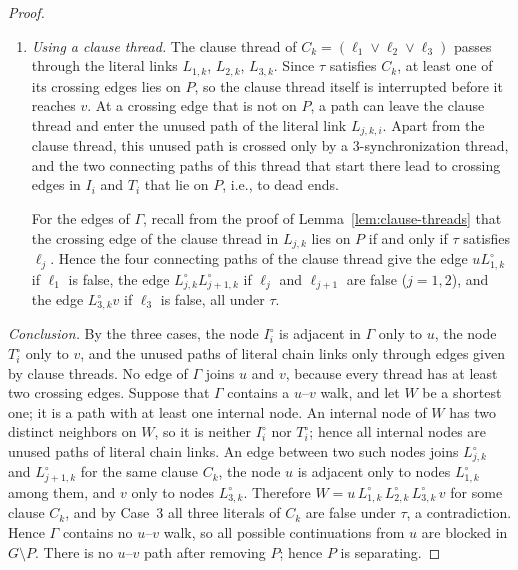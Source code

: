 \begin{proof}
\begin{enumerate}
  \item \emph{Using a clause thread.}
  The clause thread of $C_k = (\ell_1 \vee \ell_2 \vee \ell_3)$ passes through the literal links $L_{1,k}$, $L_{2,k}$, $L_{3,k}$.
  Since $\tau$ satisfies $C_k$, at least one of its crossing edges lies on $P$, so the clause thread itself is interrupted before it reaches $v$.
  At a crossing edge that is not on $P$, a path can leave the clause thread and enter the unused path of the literal link $L_{j,k,i}$.
  Apart from the clause thread, this unused path is crossed only by a 3-synchronization thread, and the two connecting paths of this thread that start there lead to crossing edges in $I_i$ and $T_i$ that lie on $P$, i.e., to dead ends.

  For the edges of $\Gamma$, recall from the proof of Lemma~\ref{lem:clause-threads} that the crossing edge of the clause thread in $L_{j,k}$ lies on $P$ if and only if $\tau$ satisfies $\ell_j$.
  Hence the four connecting paths of the clause thread give the edge $uL_{1,k}^{\circ}$ if $\ell_1$ is false, the edge $L_{j,k}^{\circ}L_{j+1,k}^{\circ}$ if $\ell_j$ and $\ell_{j+1}$ are false ($j=1,2$), and the edge $L_{3,k}^{\circ}v$ if $\ell_3$ is false, all under $\tau$.
\end{enumerate}

\emph{Conclusion.}
By the three cases, the node $I_i^{\circ}$ is adjacent in $\Gamma$ only to $u$, the node $T_i^{\circ}$ only to $v$, and the unused paths of literal chain links only through edges given by clause threads.
No edge of $\Gamma$ joins $u$ and $v$, because every thread has at least two crossing edges.
Suppose that $\Gamma$ contains a $u$--$v$ walk, and let $W$ be a shortest one; it is a path with at least one internal node.
An internal node of $W$ has two distinct neighbors on $W$, so it is neither $I_i^{\circ}$ nor $T_i^{\circ}$; hence all internal nodes are unused paths of literal chain links.
An edge between two such nodes joins $L_{j,k}^{\circ}$ and $L_{j+1,k}^{\circ}$ for the same clause $C_k$, the node $u$ is adjacent only to nodes $L_{1,k}^{\circ}$ among them, and $v$ only to nodes $L_{3,k}^{\circ}$.
Therefore $W = u\,L_{1,k}^{\circ}\,L_{2,k}^{\circ}\,L_{3,k}^{\circ}\,v$ for some clause $C_k$, and by Case~3 all three literals of $C_k$ are false under $\tau$, a contradiction.
Hence $\Gamma$ contains no $u$--$v$ walk, so all possible continuations from $u$ are blocked in $G\setminus P$.
There is no $u$--$v$ path after removing $P$; hence $P$ is separating.
\end{proof}

